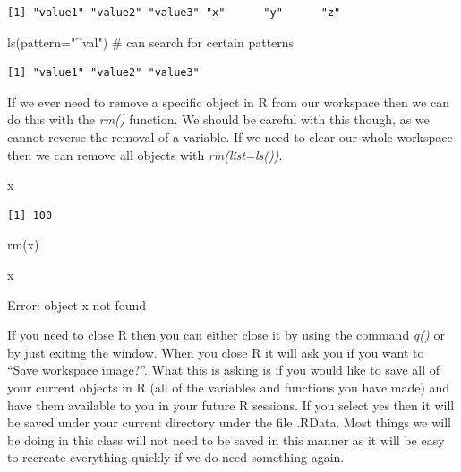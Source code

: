 \documentclass[
  letterpaper,
  DIV=11,
  numbers=noendperiod]{scrreprt}
\newenvironment{Shaded}{\begin{snugshade}}{\end{snugshade}}
\newcommand{\AttributeTok}[1]{\textcolor[rgb]{0.40,0.45,0.13}{#1}}
\newcommand{\CommentTok}[1]{\textcolor[rgb]{0.37,0.37,0.37}{#1}}
\newcommand{\FunctionTok}[1]{\textcolor[rgb]{0.28,0.35,0.67}{#1}}
\newcommand{\NormalTok}[1]{\textcolor[rgb]{0.00,0.23,0.31}{#1}}
\newcommand{\StringTok}[1]{\textcolor[rgb]{0.13,0.47,0.30}{#1}}
\begin{document}
\begin{verbatim}
[1] "value1" "value2" "value3" "x"      "y"      "z"     
\end{verbatim}

\begin{Shaded}
\begin{Highlighting}[]
\FunctionTok{ls}\NormalTok{(}\AttributeTok{pattern=}\StringTok{"\^{}val"}\NormalTok{) }\CommentTok{\# can search for certain patterns}
\end{Highlighting}
\end{Shaded}

\begin{verbatim}
[1] "value1" "value2" "value3"
\end{verbatim}

If we ever need to remove a specific object in R from our workspace then
we can do this with the \emph{rm()} function. We should be careful with
this though, as we cannot reverse the removal of a variable. If we need
to clear our whole workspace then we can remove all objects with
\emph{rm(list=ls())}.

\begin{Shaded}
\begin{Highlighting}[]
\NormalTok{x}
\end{Highlighting}
\end{Shaded}

\begin{verbatim}
[1] 100
\end{verbatim}

\begin{Shaded}
\begin{Highlighting}[]
\FunctionTok{rm}\NormalTok{(x)}
\end{Highlighting}
\end{Shaded}

\begin{Shaded}
\begin{Highlighting}[]
\NormalTok{x}
\end{Highlighting}
\end{Shaded}

{Error: object \textquotesingle x\textquotesingle{} not found}

If you need to close R then you can either close it by using the command
\emph{q()} or by just exiting the window. When you close R it will ask
you if you want to ``Save workspace image?''. What this is asking is if
you would like to save all of your current objects in R (all of the
variables and functions you have made) and have them available to you in
your future R sessions. If you select yes then it will be saved under
your current directory under the file .RData. Most things we will be
doing in this class will not need to be saved in this manner as it will
be easy to recreate everything quickly if we do need something again.
\end{document}
